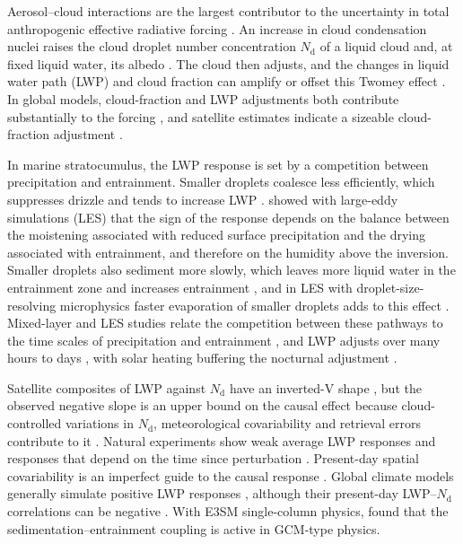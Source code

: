 \documentclass[acp, manuscript]{copernicus}
\newcommand{\Nd}{N_\mathrm{d}}
\begin{document}
\introduction

Aerosol--cloud interactions are the largest contributor to the uncertainty in total anthropogenic effective radiative forcing \citep{bellouin2020,forster2021}. An increase in cloud condensation nuclei raises the cloud droplet number concentration $\Nd$ of a liquid cloud and, at fixed liquid water, its albedo \citep{twomey1974,twomey1977}. The cloud then adjusts, and the changes in liquid water path (LWP) and cloud fraction can amplify or offset this Twomey effect \citep{stevens2009,mulmenstadt2018,glassmeier2021}. In global models, cloud-fraction and LWP adjustments both contribute substantially to the forcing \citep{mulmenstadt2019}, and satellite estimates indicate a sizeable cloud-fraction adjustment \citep{gryspeerdt2016}.

In marine stratocumulus, the LWP response is set by a competition between precipitation and entrainment. Smaller droplets coalesce less efficiently, which suppresses drizzle and tends to increase LWP \citep[precipitation suppression;][]{albrecht1989}. \citet{ackerman2004} showed with large-eddy simulations (LES) that the sign of the response depends on the balance between the moistening associated with reduced surface precipitation and the drying associated with entrainment, and therefore on the humidity above the inversion. Smaller droplets also sediment more slowly, which leaves more liquid water in the entrainment zone and increases entrainment \citep{bretherton2007}, and in LES with droplet-size-resolving microphysics faster evaporation of smaller droplets adds to this effect \citep{wang2003,hill2009,small2009}. Mixed-layer and LES studies relate the competition between these pathways to the time scales of precipitation and entrainment \citep{wood2007,uchida2010,hoffmann2020,hoffmann2024,hoffmann2025}, and LWP adjusts over many hours to days \citep{glassmeier2021,chen2025}, with solar heating buffering the nocturnal adjustment \citep{zhang2024,chen2024}.

Satellite composites of LWP against $\Nd$ have an inverted-V shape \citep{chen2014,gryspeerdt2019,possner2020}, but the observed negative slope is an upper bound on the causal effect because cloud-controlled variations in $\Nd$, meteorological covariability and retrieval errors contribute to it \citep{gryspeerdt2019,arola2022,kokkola2025}. Natural experiments show weak average LWP responses \citep{toll2019} and responses that depend on the time since perturbation \citep{gryspeerdt2021,gryspeerdt2022,fons2023}. Present-day spatial covariability is an imperfect guide to the causal response \citep{ghan2016,mahfouz2024,jia2021}. Global climate models generally simulate positive LWP responses \citep{michibata2016,gettelman2015ci,mulmenstadt2020}, although their present-day LWP--$\Nd$ correlations can be negative \citep{mulmenstadt2024gcm}. With E3SM single-column physics, \citet{mulmenstadt2024adj} found that the sedimentation--entrainment coupling is active in GCM-type physics.
\end{document}
